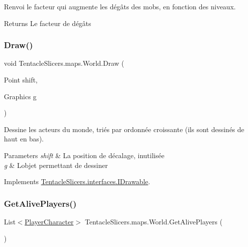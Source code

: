 Renvoi le facteur qui augmente les dégâts des mobs, en fonction des niveaux. 

\begin{DoxyReturn}{Returns}
Le facteur de dégâts 
\end{DoxyReturn}
\mbox{\label{class_tentacle_slicers_1_1maps_1_1_world_ae5532fc6ce77572a16b4723ddc88055e}} 
\subsubsection{\texorpdfstring{Draw()}{Draw()}}
{\footnotesize\ttfamily void Tentacle\+Slicers.\+maps.\+World.\+Draw (\begin{DoxyParamCaption}\item[{Point}]{shift,  }\item[{Graphics}]{g }\end{DoxyParamCaption})}



Dessine les acteurs du monde, triés par ordonnée croissante (ils sont dessinés de haut en bas). 


\begin{DoxyParams}{Parameters}
{\em shift} & La position de décalage, inutilisée \\
\hline
{\em g} & L\textquotesingle{}objet permettant de dessiner \\
\hline
\end{DoxyParams}


Implements \hyperlink{interface_tentacle_slicers_1_1interfaces_1_1_i_drawable}{Tentacle\+Slicers.\+interfaces.\+I\+Drawable}.

\mbox{\label{class_tentacle_slicers_1_1maps_1_1_world_ace5271f17f83aaa36a16746da29f896a}} 
\subsubsection{\texorpdfstring{Get\+Alive\+Players()}{GetAlivePlayers()}}
{\footnotesize\ttfamily List$<$\hyperlink{class_tentacle_slicers_1_1actors_1_1_player_character}{Player\+Character}$>$ Tentacle\+Slicers.\+maps.\+World.\+Get\+Alive\+Players (\begin{DoxyParamCaption}{ }\end{DoxyParamCaption})}



